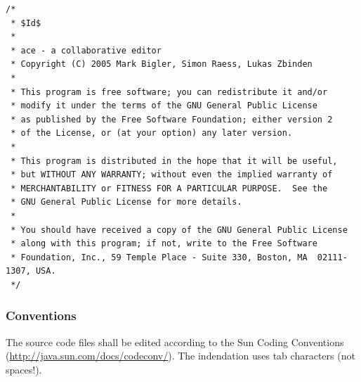 \documentclass[11pt,a4paper]{article}
\begin{document}
\small{
\begin{verbatim}
/*
 * $Id$
 *
 * ace - a collaborative editor
 * Copyright (C) 2005 Mark Bigler, Simon Raess, Lukas Zbinden
 *
 * This program is free software; you can redistribute it and/or
 * modify it under the terms of the GNU General Public License
 * as published by the Free Software Foundation; either version 2
 * of the License, or (at your option) any later version.
 *
 * This program is distributed in the hope that it will be useful,
 * but WITHOUT ANY WARRANTY; without even the implied warranty of
 * MERCHANTABILITY or FITNESS FOR A PARTICULAR PURPOSE.  See the
 * GNU General Public License for more details.
 *
 * You should have received a copy of the GNU General Public License
 * along with this program; if not, write to the Free Software
 * Foundation, Inc., 59 Temple Place - Suite 330, Boston, MA  02111-1307, USA.
 */
\end{verbatim}
}

\subsubsection*{Conventions}

The source code files shall be edited according to the Sun Coding Conventions (\href{http://java.sun.com/docs/codeconv/}{http://java.sun.com/docs/codeconv/}).
The indendation uses tab characters (not spaces!).
\end{document}
